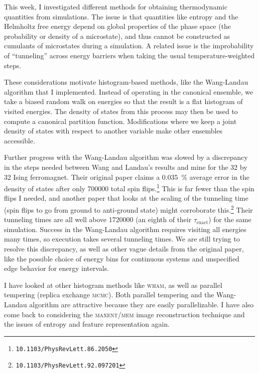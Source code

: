 \documentclass[../notebook.tex]{subfiles}
\begin{document}
\label{sec:sum2}

This week, I investigated different methods for obtaining thermodynamic
quantities from simulations. The issue is that quantities like entropy and the
Helmholtz free energy depend on global properties of the phase space (the
probability or density of a microstate), and thus cannot be constructed as
cumulants of microstates during a simulation. A related issue is the
improbability of ``tunneling'' across energy barriers when taking the usual
temperature-weighted steps.

These considerations motivate histogram-based methods, like the Wang-Landau
algorithm that I implemented. Instead of operating in the canonical ensemble, we
take a biased random walk on energies so that the result is a flat histogram of
visited energies. The density of states from this process may then be used to
compute a canonical partition function. Modifications where we keep a joint
density of states with respect to another variable make other ensembles
accessible.

Further progress with the Wang-Landau algorithm was slowed by a discrepancy in
the steps needed between Wang and Landau's results and mine for the 32 by 32
Ising ferromagnet. Their original paper claims a \SI{0.035}{\percent} average
error in the density of states after only \num{700000} total spin
flips.\footnote{\texttt{10.1103/PhysRevLett.86.2050}} This is far fewer than the
spin flips I needed, and another paper that looks at the scaling of the
tunneling time (spin flips to go from ground to anti-ground state) might
corroborate this.\footnote{\texttt{10.1103/PhysRevLett.92.097201}} Their
tunneling times are all well above \num{1720000} (an eighth of their
$\tau_\text{exact}$) for the same simulation. Success in the Wang-Landau
algorithm requires visiting all energies many times, so execution takes several
tunneling times. We are still trying to resolve this discrepancy, as well as
other vague details from the original paper, like the possible choice of energy
bins for continuous systems and unspecified edge behavior for energy intervals.

I have looked at other histogram methods like \textsc{wham}, as well as parallel
tempering (replica exchange \textsc{mcmc}). Both parallel tempering and the
Wang-Landau algorithm are attractive because they are easily parallelizable. I
have also come back to considering the \textsc{maxent}/\textsc{mem} image
reconstruction technique and the issues of entropy and feature representation
again.
\end{document}
